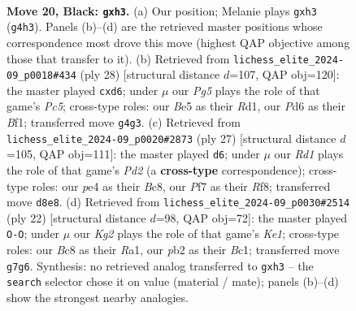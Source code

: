 \documentclass[11pt]{article}
\begin{document}
\clearpage

\begin{figure}[p]\centering
\begin{subfigure}{0.46\textwidth}\centering
\resizebox{\linewidth}{!}{%
\newchessgame
\chessboard[
  setfen={r1br4/ppp2pk1/3p4/4b2p/N1P1Pnpq/4Q2P/PP3PP1/RBB1R1K1 b - - 1 20},
  showmover=false,
  pgfstyle=straightmove, color=movearrow, markmove={g4-h3}
]}
\caption{}
\end{subfigure}\hfill
\begin{subfigure}{0.46\textwidth}\centering
\resizebox{\linewidth}{!}{%
\newchessgame
\chessboard[
  setfen={r1b2rk1/pp3pbp/2np1qp1/2PQ4/4p3/P1N1B3/1PP2PPP/2KR1B1R w - - 0 15},
  showmover=false,
  pgfstyle=straightmove, color=movearrow, markmove={c5-d6}
]}
\caption{}
\end{subfigure}
\\[4pt]
\begin{subfigure}{0.46\textwidth}\centering
\resizebox{\linewidth}{!}{%
\newchessgame
\chessboard[
  setfen={r1b2rk1/2pp1pp1/p6p/4p3/Pp1bP1nq/1B2NQ2/1PP2P1P/R1B1K2R b KQ - 1 14},
  showmover=false,
  pgfstyle=straightmove, color=movearrow, markmove={d7-d6}
]}
\caption{}
\end{subfigure}\hfill
\begin{subfigure}{0.46\textwidth}\centering
\resizebox{\linewidth}{!}{%
\newchessgame
\chessboard[
  setfen={r1b1kr2/pp2bpQp/2nqp3/2p5/3P4/P1PB1N2/2P2PPP/R1B1K2R w KQq - 0 12},
  showmover=false,
  pgfstyle=straightmove, color=movearrow, markmove={e1-g1}
]}
\caption{}
\end{subfigure}
\caption{\textbf{Move 20, Black: \texttt{gxh3}.} (a) Our position; Melanie plays \texttt{gxh3} (\texttt{g4h3}). Panels (b)--(d) are the retrieved master positions whose correspondence most drove this move (highest QAP objective among those that transfer to it). (b) Retrieved from \texttt{lichess\_elite\_2024-09\_p0018\#434} (ply 28) [structural distance $d$=107, QAP obj=120]: the master played \texttt{cxd6}; under $\mu$ our \emph{Pg5} plays the role of that game's \emph{Pc5}; cross-type roles: our \emph{B}e5 as their \emph{R}d1, our \emph{P}d6 as their \emph{B}f1; transferred move \texttt{g4g3}. (c) Retrieved from \texttt{lichess\_elite\_2024-09\_p0020\#2873} (ply 27) [structural distance $d$=105, QAP obj=111]: the master played \texttt{d6}; under $\mu$ our \emph{Rd1} plays the role of that game's \emph{Pd2} (a \textbf{cross-type} correspondence); cross-type roles: our \emph{p}e4 as their \emph{B}c8, our \emph{P}f7 as their \emph{R}f8; transferred move \texttt{d8e8}. (d) Retrieved from \texttt{lichess\_elite\_2024-09\_p0030\#2514} (ply 22) [structural distance $d$=98, QAP obj=72]: the master played \texttt{O-O}; under $\mu$ our \emph{Kg2} plays the role of that game's \emph{Ke1}; cross-type roles: our \emph{B}c8 as their \emph{R}a1, our \emph{p}b2 as their \emph{B}c1; transferred move \texttt{g7g6}. Synthesis: no retrieved analog transferred to \texttt{gxh3} -- the \texttt{search} selector chose it on value (material / mate); panels (b)--(d) show the strongest nearby analogies.}
\label{fig:thought-m39}
\end{figure}
\end{document}
